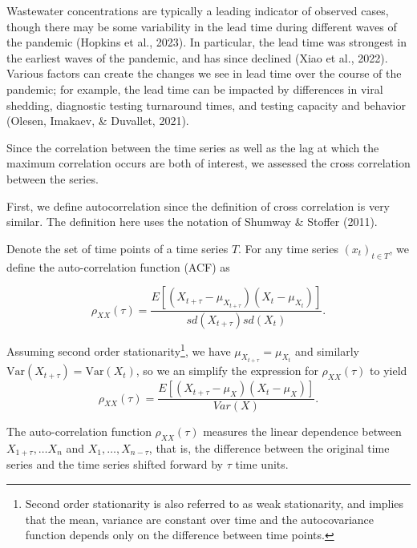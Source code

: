 \documentclass[12pt,twoside]{smiththesis}
\begin{document}
Wastewater concentrations are typically a leading indicator of observed cases, though there may be some variability in the lead time during different waves of the pandemic (Hopkins et al., 2023). In particular, the lead time was strongest in the earliest waves of the pandemic, and has since declined (Xiao et al., 2022). Various factors can create the changes we see in lead time over the course of the pandemic; for example, the lead time can be impacted by differences in viral shedding, diagnostic testing turnaround times, and testing capacity and behavior (Olesen, Imakaev, \& Duvallet, 2021).

Since the correlation between the time series as well as the lag at which the maximum correlation occurs are both of interest, we assessed the cross correlation between the series.

First, we define autocorrelation since the definition of cross correlation is very similar. The definition here uses the notation of Shumway \& Stoffer (2011).
\begin{tcolorbox}[title=Definition: Autocorrelation]

Denote the set of time points of a time series $T$. For any time series $(x_t)_{t\in T}$, we define the auto-correlation function (ACF)  as 

$$\rho_{XX}(\tau) = \dfrac{E[(X_{t + \tau} - \mu_{X_{t+\tau}}) (X_t - \mu_{X_t})]}{sd(X_{t+\tau}) sd(X_t)}.$$
\end{tcolorbox}
Assuming second order stationarity\footnote{Second order stationarity is also referred to as weak stationarity, and implies that the mean, variance are constant over time and the autocovariance function depends only on the difference between time points.}, we have \(\mu_{X_{t+\tau}}=\mu_{X_{t}}\)
and similarly \(\text{Var}({X_{t+\tau}})=\text{Var}({X_{t}})\), so we an simplify the expression for \(\rho_{XX} (\tau)\) to yield\\
\[\rho_{XX} (\tau)=\dfrac{E[(X_{t + \tau} - \mu_{X}) (X_t - \mu_{X})]}{Var(X)}.\]

The auto-correlation function \(\rho_{XX}(\tau)\) measures the linear dependence between \(X_{1+\tau}, \dots X_n\) and \(X_1, \dots, X_{n-\tau}\), that is, the difference between the original time series and the time series shifted forward by \(\tau\) time units.
\end{document}
